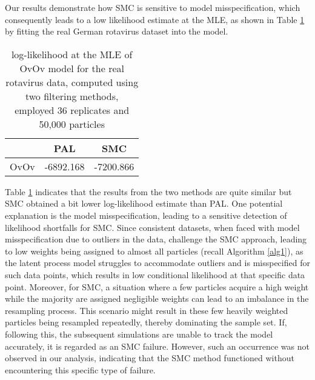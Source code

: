 \documentclass[10pt]{article}
\begin{document}
Our results demonstrate how SMC is sensitive to model misspecification, which consequently leads to a low likelihood estimate at the MLE, as shown in Table \ref{tab:ovovrealdata} by fitting the real German rotavirus dataset into the model.

\begin{table}[ht] %
\centering %
\caption{log-likelihood at the MLE of OvOv model for the real rotavirus data, computed using two filtering methods, employed 36 replicates and 50,000 particles} %
\label{tab:ovovrealdata} %
\begin{tabular}{|c c c|} 
 \hline
  & PAL & SMC  \\
  \hline
 OvOv & -6892.168 & -7200.866 \\ 
 \hline
\end{tabular}
\end{table}
\vspace{-3mm}

Table \ref{tab:ovovrealdata} indicates that the results from the two methods are quite similar but SMC obtained a bit lower log-likelihood estimate than PAL. One potential explanation is the model misspecification, leading to a sensitive detection of likelihood shortfalls for SMC. Since consistent datasets, when faced with model misspecification due to outliers in the data, challenge the SMC approach, leading to low weights being assigned to almost all particles (recall Algorithm \ref{alg1}), as the latent process model struggles to accommodate outliers and is misspecified for such data points, which results in low conditional likelihood at that specific data point. Moreover, for SMC, a situation where a few particles acquire a high weight while the majority are assigned negligible weights can lead to an imbalance in the resampling process. This scenario might result in these few heavily weighted particles being resampled repeatedly, thereby dominating the sample set. If, following this, the subsequent simulations are unable to track the model accurately, it is regarded as an SMC failure. However, such an occurrence was not observed in our analysis, indicating that the SMC method functioned without encountering this specific type of failure.
\end{document}
